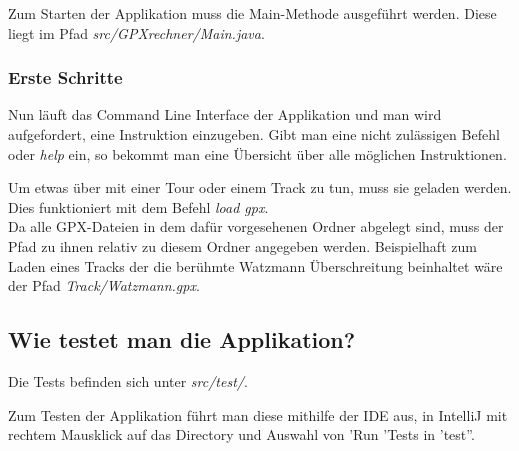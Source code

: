 Zum Starten der Applikation muss die Main-Methode ausgeführt werden. 
Diese liegt im Pfad \textit{src/GPXrechner/Main.java}.

\subsubsection{Erste Schritte}

Nun läuft das Command Line Interface der Applikation und man wird aufgefordert, eine Instruktion einzugeben.
 Gibt man eine nicht zulässigen Befehl oder \textit{help} ein, so bekommt man eine Übersicht über alle möglichen Instruktionen.
 
Um etwas über mit einer Tour oder einem Track zu tun, muss sie geladen werden. Dies funktioniert mit dem Befehl \textit{load gpx}.\\

Da alle GPX-Dateien in dem dafür vorgesehenen Ordner abgelegt sind, muss der Pfad zu ihnen relativ zu diesem Ordner angegeben werden. Beispielhaft zum Laden eines Tracks der die berühmte Watzmann Überschreitung beinhaltet wäre der Pfad \textit{Track/Watzmann.gpx}.



\subsection{Wie testet man die Applikation?}

Die Tests befinden sich unter \textit{src/test/}.

Zum Testen der Applikation führt man diese mithilfe der IDE aus, in IntelliJ mit rechtem Mausklick auf das Directory und Auswahl von 'Run 'Tests in 'test''.